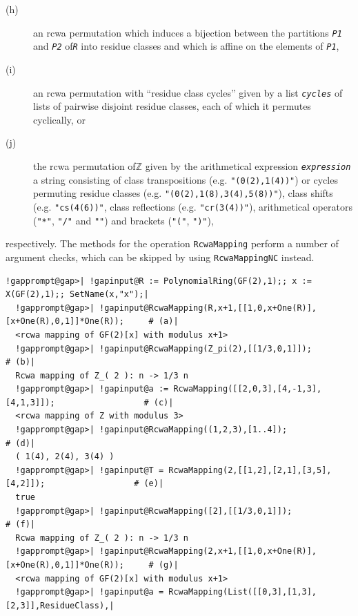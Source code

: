 \documentclass[a4paper,11pt]{report}
\begin{document}
{{{\begin{description}
\item[{(h)}]  an rcwa permutation which induces a bijection between the partitions \mbox{\texttt{\mdseries\slshape P1}} and \mbox{\texttt{\mdseries\slshape P2}} of{\nobreakspace}\mbox{\texttt{\mdseries\slshape R}} into residue classes and which is affine on the elements of \mbox{\texttt{\mdseries\slshape P1}}, 
\item[{(i)}]  an rcwa permutation with ``residue class cycles'' given by a list \mbox{\texttt{\mdseries\slshape cycles}} of lists of pairwise disjoint residue classes, each of which it permutes
cyclically, or 
\item[{(j)}]  the rcwa permutation of{\nobreakspace}{\ensuremath{\mathbb Z}} given by the
arithmetical expression \mbox{\texttt{\mdseries\slshape expression}} \texttt{}\texttt{} a string consisting of class
transpositions (e.g. \texttt{"(0(2),1(4))"}) or cycles permuting residue classes (e.g. \texttt{"(0(2),1(8),3(4),5(8))"}), class shifts (e.g. \texttt{"cs(4(6))"}, class reflections (e.g. \texttt{"cr(3(4))"}), arithmetical operators (\texttt{"*"}, \texttt{"/"} and \texttt{"\texttt{}"}) and brackets (\texttt{"("}, \texttt{")"}), 
\end{description}
 respectively. The methods for the operation \texttt{RcwaMapping} perform a number of argument checks, which can be skipped by using \texttt{RcwaMappingNC} instead. 
\begin{Verbatim}[commandchars=!@|,fontsize=\small,frame=single,label=Example]
  !gapprompt@gap>| !gapinput@R := PolynomialRing(GF(2),1);; x := X(GF(2),1);; SetName(x,"x");|
  !gapprompt@gap>| !gapinput@RcwaMapping(R,x+1,[[1,0,x+One(R)],[x+One(R),0,1]]*One(R));     # (a)|
  <rcwa mapping of GF(2)[x] with modulus x+1>
  !gapprompt@gap>| !gapinput@RcwaMapping(Z_pi(2),[[1/3,0,1]]);                              # (b)|
  Rcwa mapping of Z_( 2 ): n -> 1/3 n
  !gapprompt@gap>| !gapinput@a := RcwaMapping([[2,0,3],[4,-1,3],[4,1,3]]);                  # (c)|
  <rcwa mapping of Z with modulus 3>
  !gapprompt@gap>| !gapinput@RcwaMapping((1,2,3),[1..4]);                                   # (d)|
  ( 1(4), 2(4), 3(4) )
  !gapprompt@gap>| !gapinput@T = RcwaMapping(2,[[1,2],[2,1],[3,5],[4,2]]);                  # (e)|
  true
  !gapprompt@gap>| !gapinput@RcwaMapping([2],[[1/3,0,1]]);                                  # (f)|
  Rcwa mapping of Z_( 2 ): n -> 1/3 n
  !gapprompt@gap>| !gapinput@RcwaMapping(2,x+1,[[1,0,x+One(R)],[x+One(R),0,1]]*One(R));     # (g)|
  <rcwa mapping of GF(2)[x] with modulus x+1>
  !gapprompt@gap>| !gapinput@a = RcwaMapping(List([[0,3],[1,3],[2,3]],ResidueClass),|

\end{Verbatim}}}}
\end{document}
